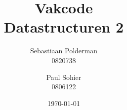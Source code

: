 \documentclass[a4paper,11pt]{report}
\begin{document}
\title{
  Vakcode\\
  Datastructuren 2
}
\author{
  Sebastiaan Polderman\\
  0820738\\
  \and
  Paul Sohier\\
  0806122
}
\date{\today}
\maketitle


\tableofcontents







%

%


\end{document}
